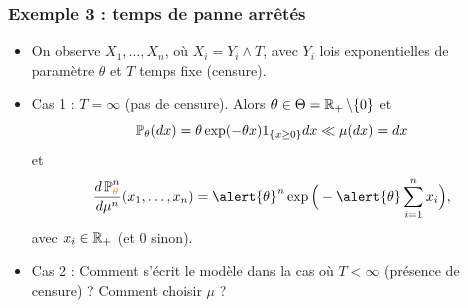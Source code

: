 \begin{frame}
\frametitle{Exemple 3 : temps de panne \og arrêtés\fg{}}
\begin{itemize}
\item On observe $X_1,\ldots, X_n$, où $X_i = Y_i \wedge T$, avec $Y_i$ \alert{lois exponentielles} de paramètre $\theta$ et $T$ \alert{temps fixe} (censure).
\item Cas 1 : $T=\infty$ (pas de censure). Alors  $\theta \in \Theta = \operatorname{{\mathbb R}}_+\setminus \{0\}$ et
$$\operatorname{{\mathbb P}}_\theta(dx) = \theta \exp(-\theta x)1_{\{x \geq 0\}}dx \ll \mu(dx) = dx$$
et
$$\frac{d\PP_{\tco{\theta}}^n}{d\mu^n}(x_1,\ldots,x_n) = \alert{\theta}^n \exp\Big(-\alert{\theta} \sum_{i = 1}^n x_i\Big),$$
\alert{avec $x_i \in \operatorname{{\mathbb R}}_+$} (et $0$ sinon).
\item Cas 2 : \alert{Comment s'écrit le modèle} dans la cas où $T<\infty$ (présence de censure) ? Comment choisir $\mu$ ?
\end{itemize}
\end{frame}





